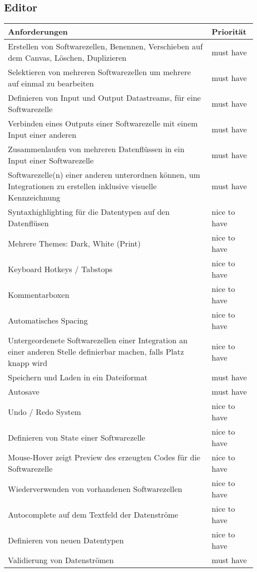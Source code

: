 \documentclass[11pt]{article}
\begin{document}
\subsection{Editor}
\label{sec:orgheadline8}
\begin{center}
\begin{tabular}{ll}
Anforderungen & Priorität\\
\hline
Erstellen von Softwarezellen, Benennen, Verschieben auf dem Canvas, Löschen, Duplizieren & must have\\
Selektieren von mehreren Softwarezellen um mehrere auf einmal zu bearbeiten & must have\\
Definieren von Input und Output Datastreams, für eine Softwarezelle & must have\\
Verbinden eines Outputs einer Softwarezelle mit einem Input einer anderen & must have\\
Zusammenlaufen von mehreren Datenflüssen in ein Input einer Softwarezelle & must have\\
Softwarezelle(n) einer anderen unterordnen können, um Integrationen zu erstellen inklusive visuelle Kennzeichnung & must have\\
Syntaxhighlighting für die Datentypen auf den Datenflüsen & nice to have\\
Mehrere Themes: Dark, White (Print) & nice to have\\
Keyboard Hotkeys / Tabstops & nice to have\\
Kommentarboxen & nice to have\\
Automatisches Spacing & nice to have\\
Untergeordenete Softwarezellen einer Integration an einer anderen Stelle definierbar machen, falls Platz knapp wird & nice to have\\
Speichern und Laden in ein Dateiformat & must have\\
Autosave & must have\\
Undo / Redo System & nice to have\\
Definieren von State einer Softwarezelle & nice to have\\
Mouse-Hover zeigt Preview des erzeugten Codes für die Softwarezelle & nice to have\\
Wiederverwenden von vorhandenen Softwarezellen & nice to have\\
Autocomplete auf dem Textfeld der Datenströme & nice to have\\
Definieren von neuen Datentypen & nice to have\\
Validierung von Datenströmen & must have\\
\end{tabular}
\end{center}
\end{document}
